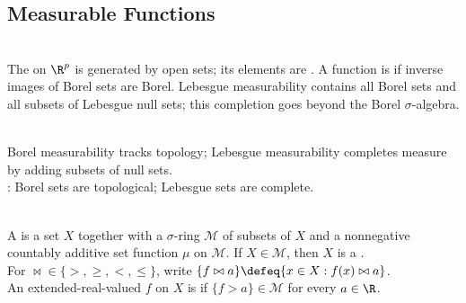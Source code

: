 \subsection{Measurable Functions}

%

\begin{definition} \label{def:borel-and-lebesgue-measurability} \\
The  on $\R^p$ is generated by open sets; its elements are . A function is  if inverse images of Borel sets are Borel. Lebesgue measurability contains all Borel sets and all subsets of Lebesgue null sets; this completion goes beyond the Borel $\sigma$-algebra.
\end{definition}

\begin{perspective} \label{per:borel-lebesgue-tradeoff} \\
Borel measurability tracks topology; Lebesgue measurability completes measure by adding subsets of null sets.\\
: Borel sets are topological; Lebesgue sets are complete.
\end{perspective}

\begin{definition} \label{def:measure-space-and-measurable-functions} \\
A  is a set $X$ together with a $\sigma$-ring $\mathcal{M}$ of subsets of $X$ and a nonnegative countably additive set function $\mu$ on $\mathcal{M}$. If $X\in\mathcal{M}$, then $X$ is a .\\
For $\bowtie\in\{>,\geq,<,\leq\}$, write $\{f\bowtie a\}\defeq\{x\in X:f(x)\bowtie a\}$.\\
An extended-real-valued $f$ on $X$ is  if $\{f>a\}\in\mathcal{M}$ for every $a\in\R$.
\end{definition}


